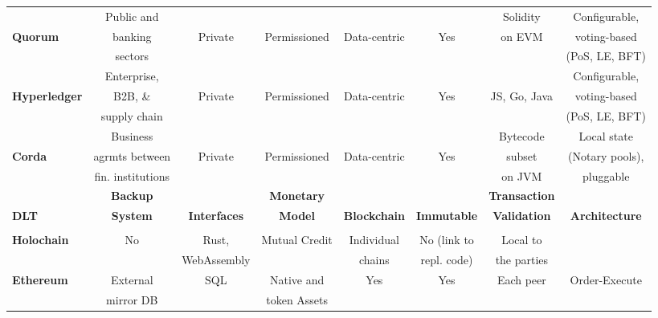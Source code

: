 \begin{table}
\begin{centering}
{\begin{tabular}{| l | c | c | c | c | c | c | c |}
				&Public and  			&			&				&			&		&Solidity
				&Configurable,				\\
\textbf{Quorum} 	&banking  			&Private		&Permissioned		&Data-centric	&Yes		&on EVM
				&voting-based 				\\
			 	&sectors				&			&				&			&		&
				&(PoS, LE, BFT)					\\
\hline
				&Enterprise,			&			&				&			&		&
				&Configurable,	\\
\textbf{Hyperledger}	&B2B, \&				&Private		&Permissioned		&Data-centric	&Yes		&JS, Go, Java
				&voting-based	\\
			 	&supply chain		&			&				&			&		&
				&(PoS, LE, BFT)					\\
\hline
				&Business	 		&			&				&			&		&Bytecode
				&Local state			\\
\textbf{Corda} 		&agrmts between			&Private		&Permissioned		&Data-centric	&Yes		&subset
				&(Notary pools),			\\
		 		&fin. institutions			&			&				&			&		&on JVM
				&pluggable			\\
\hline
\hline
\hline
\hline
				& \textbf{Backup} 		& \textbf{}				&\textbf{Monetary}
				& \textbf{}  			& \textbf{}  			& \textbf{Transaction} 	& \\
\textbf{DLT}		& \textbf{System} 		& \textbf{Interfaces}		&\textbf{Model} 
				& \textbf{Blockchain} 	& \textbf{Immutable} 		& \textbf{Validation} 		& \textbf{Architecture} \\
				& \textbf{} 				& \textbf{}				&\textbf{}
				& \textbf{} 				& \textbf{} 				& \textbf{} 				&\\
\hline
\hline
\textbf{Holochain}	&No			&Rust, &Mutual Credit
				&Individual	&No (link to		&Local to	& \\
				&			&WebAssembly	& 
				&chains 		&repl. code)		&the parties		& \\
\hline
\textbf{Ethereum}	&External		&SQL			&Native and 
				&Yes			&Yes				&Each peer		&Order-Execute \\
				&mirror DB	&				&token Assets 
				& 			&				&				& \\
\hline


\end{tabular}}
\end{centering}
\end{table}
